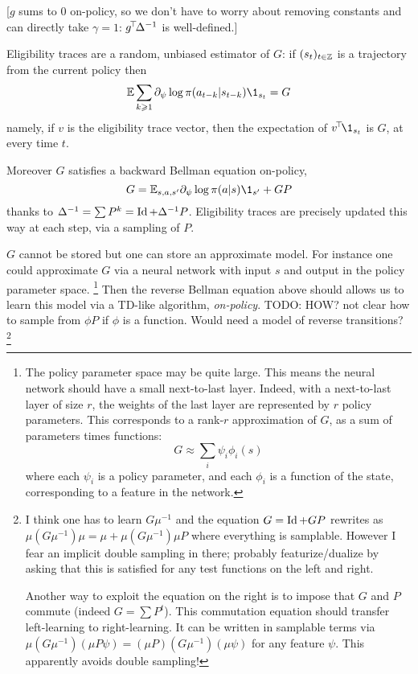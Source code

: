 \documentclass[11pt,a4paper]{article}
\begin{document}
[$g$ sums to $0$ on-policy, so we don't have to worry about removing
constants and can directly take $\gamma=1$: $g^{\!\top}\!\Delta^{-1}$ is
well-defined.]

Eligibility traces are a random, unbiased estimator of $G$: if
$(s_t)_{t\in {\mathbb{Z}}}$ is a
trajectory from the current policy then
\begin{equation}
\E\sum_{k\geq 1}\partial_\psi \log \pi(a_{t-k}|s_{t-k})\1_{s_t}=G
\end{equation}
namely, if $v$ is the eligibility trace vector, then the expectation of
$\transp{v}\1_{s_t}$ is $G$, at every time $t$.

Moreover $G$ satisfies a backward Bellman equation on-policy,
\begin{equation}
G=\E_{s,a,s'} \partial_\psi \log \pi(a|s)\1_{s'}+GP
\end{equation}
thanks to $\Delta^{-1}=\sum P^k=\operatorname{Id}+\Delta^{-1}P$. Eligibility traces are
precisely
updated this way at each step, via a sampling of $P$.

$G$ cannot be stored but one can store an approximate model. For instance
one could approximate $G$ via a neural network with input $s$ and output
in the policy parameter space. \footnote{The policy parameter space may
be quite large. This means the neural network should have a small
next-to-last layer. Indeed, with a next-to-last layer of size $r$,
the weights of the last layer are represented by $r$ policy parameters.
This corresponds to a rank-$r$ approximation of $G$,
as a sum of parameters times functions:
\begin{equation}
G\approx \sum_i \psi_i \phi_i(s)
\end{equation}
where each $\psi_i$ is a policy parameter, and each $\phi_i$ is
a function of the state, corresponding to a feature in the network.} Then the reverse
Bellman equation above should allows us to learn this model via
a TD-like algorithm, \emph{on-policy}. TODO: HOW? not clear how to
sample from $\phi P$ if $\phi$ is a function. Would need a model of
reverse transitions? \footnote{I think one has to learn $G\mu^{-1}$ and
the equation $G=\operatorname{Id}+GP$ rewrites as $\mu
(G\mu^{-1})\mu=\mu+\mu(G\mu^{-1})\mu P$ where everything is samplable.
However I fear an implicit double sampling in there; probably
featurize/dualize
by asking that this is satisfied for any test functions on the left and right.

Another way to exploit the equation on the right is to impose that $G$
and $P$ commute (indeed $G=\sum P^t$). This commutation equation should
transfer left-learning to right-learning. It can be written in samplable
terms
via $\mu(G\mu^{-1})(\mu P\psi)=(\mu P)(G \mu^{-1})(\mu
\psi)$ for any feature $\psi$. This apparently avoids double sampling!
}
\end{document}
